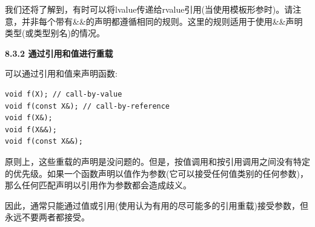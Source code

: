我们还将了解到，有时可以将lvalue传递给rvalue引用(当使用模板形参时)。请注意，并非每个带有\&\&的声明都遵循相同的规则。这里的规则适用于使用\&\&声明类型(或类型别名)的情况。\par

\hspace*{\fill} \par %
\textbf{8.3.2 通过引用和值进行重载}

可以通过引用和值来声明函数:\par

\begin{lstlisting}[caption={}]
void f(X); // call-by-value
void f(const X&); // call-by-reference
void f(X&);
void f(X&&);
void f(const X&&);
\end{lstlisting}

原则上，这些重载的声明是没问题的。但是，按值调用和按引用调用之间没有特定的优先级。如果一个函数声明以值作为参数(它可以接受任何值类别的任何参数)，那么任何匹配声明以引用作为参数都会造成歧义。\par

因此，通常只能通过值或引用(使用认为有用的尽可能多的引用重载)接受参数，但永远不要两者都接受。\par


































































